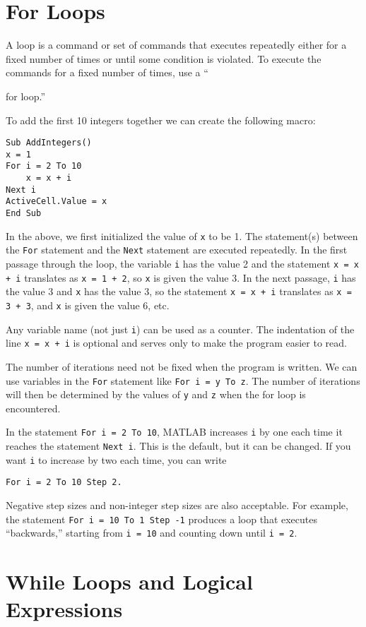 \section{For Loops}

A loop is a command or set of commands that executes repeatedly either for a fixed number of times or until some condition is violated.  To execute the commands for a fixed number of times, use a ``{for loop.''

To add the first 10 integers together we can create the following macro:
\small\begin{verbatim}
Sub AddIntegers()
x = 1
For i = 2 To 10
    x = x + i
Next i
ActiveCell.Value = x
End Sub
\end{verbatim}\normalsize
In the above, we first initialized the value of \verb!x! to be 1.  The statement(s) between the \verb!For! statement and the \verb!Next! statement are executed repeatedly.  In the first passage through the loop, the variable \verb!i! has the value 2 and the statement \verb!x = x + i! translates as \verb!x = 1 + 2!, so \verb!x! is given the value 3.  In the next passage, \verb!i! has the value 3 and \verb!x! has the value 3, so the statement \verb!x = x + i! translates as \verb!x = 3 + 3!, and \verb!x! is given the value 6, etc.  

Any variable name (not just \verb!i!) can be used as a counter.  The indentation of the line \verb!x = x + i! is optional and serves only to make the program easier to read.

The number of iterations need not be fixed when the program is written.  We can use variables in the \verb!For! statement like \verb!For i = y To z!.  The number of iterations will then be determined by the values of \verb!y! and \verb!z! when the for loop is encountered.  

In the statement \verb!For i = 2 To 10!, MATLAB increases \verb!i! by one each time it reaches the statement \verb!Next i!.  This is the default, but it can be changed.  If you want \verb!i! to increase by two each time, you can write 
\small\begin{verbatim}
For i = 2 To 10 Step 2.
\end{verbatim}\normalsize
Negative step sizes and non-integer step sizes are also acceptable.  For example, the statement \verb!For i = 10 To 1 Step -1! produces a loop that executes ``backwards,'' starting from \verb!i = 10! and counting down until \verb!i = 2!.  

\section{While Loops and Logical Expressions}

}
